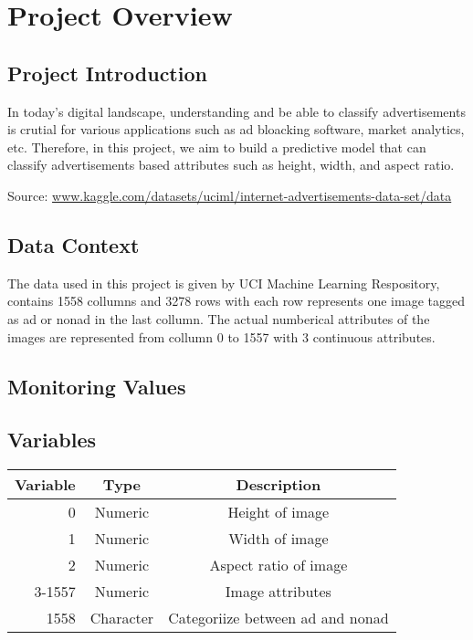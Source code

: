 \section{Project Overview}
  \subsection{Project Introduction}
  In today's digital landscape, understanding and be able to classify advertisements is crutial for various applications such as ad bloacking software, market analytics, etc.
Therefore, in this project, we aim to build a predictive model that can classify advertisements based attributes such as height, width, and aspect ratio.
  

  Source: \small\url{www.kaggle.com/datasets/uciml/internet-advertisements-data-set/data}
  \subsection{Data Context}
  The data used in this project is given by UCI Machine Learning Respository, contains 1558 collumns and 3278 rows with each row represents one image tagged as ad or nonad 
in the last collumn. The actual numberical attributes of the images are represented from collumn 0 to 1557 with 3 continuous attributes.

  \subsection{Monitoring Values}

  \subsection{Variables}
  \begin{center}
    \begin{tabular}{r|c|c}
      \textbf{Variable} & \textbf{Type} & \textbf{Description} \\
      \midrule
      0      & Numeric     & Height of image        \\
      1      & Numeric     & Width of image         \\
      2      & Numeric     & Aspect ratio of image  \\
      3-1557 & Numeric     & Image attributes       \\
      1558   & Character   & Categoriize between ad and nonad           \\
      \bottomrule
    \end{tabular}
  \end{center}